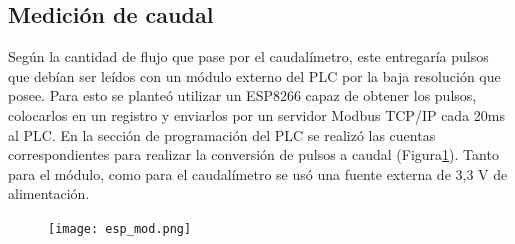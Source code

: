 \subsection{Medición de caudal}
Según la cantidad de flujo que pase por el caudalímetro, este entregaría pulsos que debían ser leídos con un módulo externo del PLC por la baja resolución que posee. Para esto se planteó utilizar un ESP8266 capaz de obtener los pulsos, colocarlos en un registro y enviarlos por un servidor Modbus TCP/IP cada 20ms al PLC. En la sección de programación del PLC se realizó las cuentas correspondientes para realizar la conversión de pulsos a caudal (Figura\ref{fig:modtcp}). Tanto para el módulo, como para el caudalímetro se usó una fuente externa de 3,3 V de alimentación.
\begin{figure}[htbp]
	\centering
	\texttt{[image: esp\_mod.png]}
	\label{fig:modtcp}
\end{figure}
\newpage

